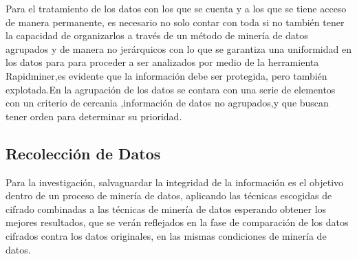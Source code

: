 \documentclass[a4paper,openright,12pt]{book}
\theoremstyle{definition}
\theoremstyle{remark}
\begin{document}
Para el tratamiento de los datos con los que se cuenta y a los que se tiene acceso de manera permanente, es necesario no solo contar con toda si no también tener la capacidad de organizarlos a través de un método de minería de datos agrupados y de manera no jerárquicos con lo que se garantiza una uniformidad en los datos para para proceder a ser analizados por medio de la herramienta Rapidminer,es evidente que la información debe ser protegida, pero también explotada.En la agrupación de los datos se contara con una serie de elementos  con un criterio de cercania ,información de datos no agrupados,y que buscan tener orden  para determinar su prioridad. 


	\subsection{Recolección de Datos}
    Para la investigación, salvaguardar la integridad de la información es el objetivo dentro de un proceso de minería de datos, aplicando las técnicas escogidas de cifrado combinadas a las técnicas de minería de datos esperando obtener los mejores resultados, que se verán reflejados en la fase de comparación de los datos cifrados contra los datos originales, en las mismas condiciones de minería de datos.
    
\end{document}
